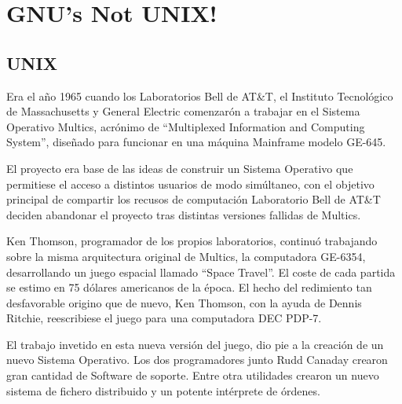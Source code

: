 \chapter{GNU's Not UNIX!}

\section{UNIX}



Era el año 1965 cuando los Laboratorios
Bell de
AT\&T, el Instituto
Tecnológico
de Massachusetts y
General Electric
comenzarón a trabajar en el Sistema
Operativo
Multics,
acrónimo de ``Multiplexed Information and Computing System'', diseñado
para funcionar en una máquina Mainframe modelo GE-645.


El proyecto era base de las ideas de construir un Sistema Operativo que
permitiese el acceso a distintos usuarios de modo simúltaneo, con el objetivo
principal de compartir los recusos de computación
Laboratorio Bell de AT\&T deciden abandonar el proyecto tras distintas versiones
fallidas de Multics.


Ken Thomson\endnote{}, programador
de los propios laboratorios, continuó trabajando sobre
la misma arquitectura original de Multics, la computadora
GE-6354, desarrollando
un juego espacial llamado ``Space Travel''. El
coste
de
cada partida se estimo en 75 dólares americanos de la época. El hecho del
redimiento tan desfavorable origino que de nuevo, Ken Thomson, con la ayuda de
Dennis Ritchie\endnote{},
reescribiese el juego para una computadora DEC PDP-7.

El trabajo invetido en esta nueva versión del juego, dio pie a la creación
de un nuevo Sistema Operativo. Los dos programadores junto Rudd
Canaday crearon
gran cantidad de Software de soporte. Entre otra utilidades crearon un nuevo
sistema de fichero distribuido y un potente intérprete de órdenes. 


